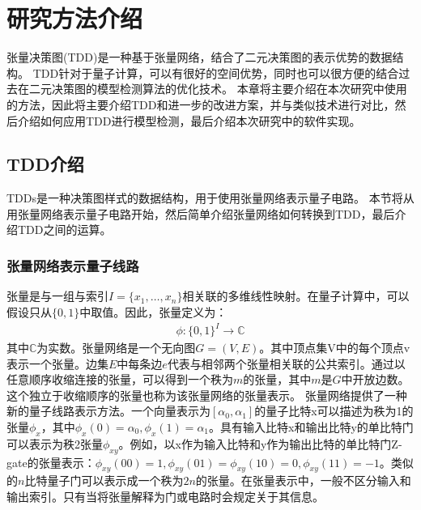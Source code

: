 \chapter{研究方法介绍}
张量决策图(TDD)是一种基于张量网络，结合了二元决策图的表示优势的数据结构。
TDD针对于量子计算，可以有很好的空间优势，同时也可以很方便的结合过去在二元决策图的模型检测算法的优化技术。
本章将主要介绍在本次研究中使用的方法，因此将主要介绍TDD和进一步的改进方案，并与类似技术进行对比，然后介绍如何应用TDD进行模型检测，最后介绍本次研究中的软件实现。
\section{TDD介绍}
TDDs是一种决策图样式的数据结构，用于使用张量网络表示量子电路。
本节将从用张量网络表示量子电路开始，然后简单介绍张量网络如何转换到TDD，最后介绍TDD之间的运算。
\subsection{张量网络表示量子线路}
张量是与一组与索引\(I=\{x_1,\ldots,x_n\}\)相关联的多维线性映射。在量子计算中，可以假设只从\(\{0,1\}\)中取值。因此，张量定义为：
\begin{align}
    \phi :{\{0,1\}}^I\rightarrow\mathbb{C}
\end{align}
其中\(\mathbb{C}\)为实数。张量网络是一个无向图\(G=\left(V,E\right)\)。其中顶点集V中的每个顶点v表示一个张量。边集\(E\)中每条边\(e\)代表与相邻两个张量相关联的公共索引。通过以任意顺序收缩连接的张量，可以得到一个秩为\(m\)的张量，其中\(m\)是$G$中开放边数。这个独立于收缩顺序的张量也称为该张量网络的张量表示\citep{biamonte2019lectures}。
张量网络提供了一种新的量子线路表示方法\citep{pednault2017breaking}。一个向量表示为$[\alpha_0,\alpha_1]$的量子比特x可以描述为秩为1的张量$\phi_x$，其中$\phi_x\left(0\right)=\alpha_0, \phi_x\left(1\right)=\alpha_1$。具有输入比特x和输出比特y的单比特门可以表示为秩2张量$\phi_{xy}$。例如，以x作为输入比特和y作为输出比特的单比特门Z-gate的张量表示：$\phi_{xy}\left(00\right)=1,\phi_{xy}\left(01\right)=\phi_{xy}\left(10\right)=0,\phi_{xy}\left(11\right)=-1$。类似的$n$比特量子门可以表示成一个秩为$2n$的张量。在张量表示中，一般不区分输入和输出索引。只有当将张量解释为门或电路时会规定关于其信息。

